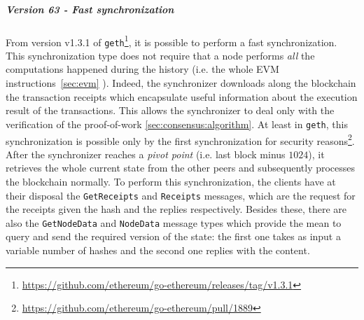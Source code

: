 \subparagraph{Version 63 - Fast synchronization}
From version v1.3.1 of
\texttt{geth}\footnote{\url{https://github.com/ethereum/go-ethereum/releases/tag/v1.3.1}},
it is possible to perform a fast synchronization. This synchronization type does
not require that a node performs \emph{all} the computations happened during the
history (i.e. the whole EVM instructions~\autoref{sec:evm} ). Indeed, the
synchronizer downloads along the blockchain the transaction receipts which
encapsulate useful information about the execution result of the transactions.
This allows the synchronizer to deal only with the verification of the
proof-of-work \autoref{sec:consensus:algorithm}. At least in \texttt{geth}, this
synchronization is possible only by the first synchronization for security
reasons\footnote{\url{https://github.com/ethereum/go-ethereum/pull/1889}}. After
the synchronizer reaches a \emph{pivot point} (i.e. last block minus $1024$), it
retrieves the whole current state from the other peers and subsequently
processes the blockchain normally. To perform this synchronization, the clients
have at their disposal the \texttt{GetReceipts} and \texttt{Receipts} messages,
which are the request for the receipts given the hash and the replies
respectively. Besides these, there are also the \texttt{GetNodeData} and
\texttt{NodeData} message types which provide the mean to query and send the
required version of the state: the first one takes as input a variable number of
hashes and the second one replies with the content.
